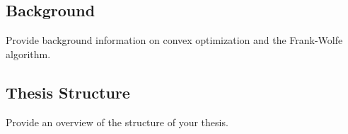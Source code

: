 \subsection{Background}
Provide background information on convex optimization and the Frank-Wolfe algorithm.

\subsection{Thesis Structure}
Provide an overview of the structure of your thesis.